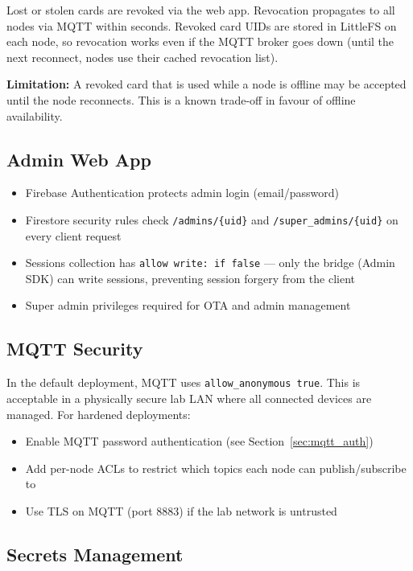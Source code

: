 Lost or stolen cards are revoked via the web app. Revocation propagates to all nodes via MQTT within seconds. Revoked card UIDs are stored in LittleFS on each node, so revocation works even if the MQTT broker goes down (until the next reconnect, nodes use their cached revocation list).

\textbf{Limitation:} A revoked card that is used while a node is offline may be accepted until the node reconnects. This is a known trade-off in favour of offline availability.

\subsection{Admin Web App}

\begin{itemize}[leftmargin=1.5em]
    \item Firebase Authentication protects admin login (email/password)
    \item Firestore security rules check \texttt{/admins/\{uid\}} and \texttt{/super\_admins/\{uid\}} on every client request
    \item Sessions collection has \texttt{allow write: if false} --- only the bridge (Admin SDK) can write sessions, preventing session forgery from the client
    \item Super admin privileges required for OTA and admin management
\end{itemize}

\subsection{MQTT Security}

In the default deployment, MQTT uses \texttt{allow\_anonymous true}. This is acceptable in a physically secure lab LAN where all connected devices are managed. For hardened deployments:

\begin{itemize}[leftmargin=1.5em]
    \item Enable MQTT password authentication (see Section~\ref{sec:mqtt_auth})
    \item Add per-node ACLs to restrict which topics each node can publish/subscribe to
    \item Use TLS on MQTT (port 8883) if the lab network is untrusted
\end{itemize}

\subsection{Secrets Management}

